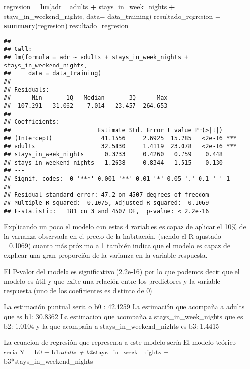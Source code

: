 \documentclass[]{article}
\newenvironment{Shaded}{\begin{snugshade}}{\end{snugshade}}
\newcommand{\DataTypeTok}[1]{\textcolor[rgb]{0.13,0.29,0.53}{#1}}
\newcommand{\KeywordTok}[1]{\textcolor[rgb]{0.13,0.29,0.53}{\textbf{#1}}}
\newcommand{\NormalTok}[1]{#1}
\newcommand{\OperatorTok}[1]{\textcolor[rgb]{0.81,0.36,0.00}{\textbf{#1}}}
\newcommand{\StringTok}[1]{\textcolor[rgb]{0.31,0.60,0.02}{#1}}
\begin{document}
\begin{Shaded}
\begin{Highlighting}[]
\NormalTok{regresion =}\StringTok{ }\KeywordTok{lm}\NormalTok{(adr }\OperatorTok{~}\StringTok{ }\NormalTok{adults }\OperatorTok{+}\StringTok{ }\NormalTok{stays_in_week_nights }\OperatorTok{+}\StringTok{ }\NormalTok{stays_in_weekend_nights, }\DataTypeTok{data=}\NormalTok{ data_training)}
\NormalTok{resultado_regresion =}\StringTok{  }\KeywordTok{summary}\NormalTok{(regresion)}
\NormalTok{resultado_regresion}
\end{Highlighting}
\end{Shaded}

\begin{verbatim}
## 
## Call:
## lm(formula = adr ~ adults + stays_in_week_nights + stays_in_weekend_nights, 
##     data = data_training)
## 
## Residuals:
##      Min       1Q   Median       3Q      Max 
## -107.291  -31.062   -7.014   23.457  264.653 
## 
## Coefficients:
##                         Estimate Std. Error t value Pr(>|t|)    
## (Intercept)              41.1556     2.6925  15.285   <2e-16 ***
## adults                   32.5830     1.4119  23.078   <2e-16 ***
## stays_in_week_nights      0.3233     0.4260   0.759    0.448    
## stays_in_weekend_nights  -1.2638     0.8344  -1.515    0.130    
## ---
## Signif. codes:  0 '***' 0.001 '**' 0.01 '*' 0.05 '.' 0.1 ' ' 1
## 
## Residual standard error: 47.2 on 4507 degrees of freedom
## Multiple R-squared:  0.1075, Adjusted R-squared:  0.1069 
## F-statistic:   181 on 3 and 4507 DF,  p-value: < 2.2e-16
\end{verbatim}

Explicando un poco el modelo con estas 4 variables es capaz de aplicar
el 10\% de la varianza observada en el precio de la habitación. (siendo
el R ajustado =0.1069) cuanto más próximo a 1 también indica que el
modelo es capaz de explicar una gran proporción de la varianza en la
variable respuesta.

El P-valor del modelo es significativo (2.2e-16) por lo que podemos
decir que el modelo es útil y que exite una relación entre los
predictores y la variable respuesta (uno de los coeficientes es distinto
de 0)

La estimación puntual seria o b0 : 42.4259 La estimación que acompaña a
adults que es b1: 30.8362 La estimacion que acompaña a
stays\_in\_week\_nights que es b2: 1.0104 y la que acompaña a
stays\_in\_weekend\_nights es b3:-1.4415

La ecuacion de regresión que representa a este modelo sería El modelo
teórico seria Y = b0 + b1\emph{adults + b2}stays\_in\_week\_nights +
b3*stays\_in\_weekend\_nights
\end{document}
